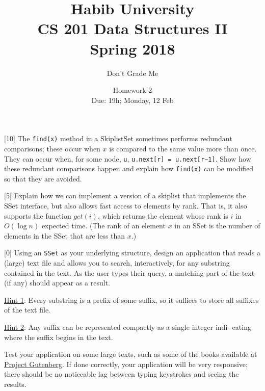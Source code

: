 \documentclass[addpoints]{exam}
\title{Habib University\\CS 201 Data Structures II\\Spring 2018}
\author{Don't Grade Me}  %
\date{Homework 2\\Due: 19h; Monday, 12 Feb}
\begin{document}
\maketitle

\begin{questions}

  [10]
  The {\tt find(x)} method in a SkiplistSet sometimes performs redundant comparisons; these occur when $x$ is compared to the same value more than once. They can occur when, for some node, {\tt u}, {\tt u.next[r] = u.next[r−1]}. Show how these redundant comparisons happen and explain how {\tt find(x)} can be modified so that they are avoided.
\begin{solution}
\end{solution}

[5]
Explain how we can implement a version of a skiplist that implements the SSet interface, but also allows fast access to elements by rank. That is, it also supports the function $get(i)$, which returns the element whose rank is $i$ in $O(\log n)$ expected time. (The rank of an element $x$ in an SSet is the number of elements in the SSet that are less than $x$.)
\begin{solution}
\end{solution}

[0]
Using an {\tt SSet} as your underlying structure, design an application that reads a (large) text file and allows you to search, interactively, for any substring contained in the text. As the user types their query, a matching part of the text (if any) should appear as a result.

\noindent\underline{Hint 1}: Every substring is a prefix of some suffix, so it suffices to store all suffixes of the text file.

\noindent\underline{Hint 2}: Any suffix can be represented compactly as a single integer indi- cating where the suffix begins in the text.

Test your application on some large texts, such as some of the books available at \href{http://www.gutenberg.org/}{Project Gutenberg}. If done correctly, your application will be very responsive; there should be no noticeable lag between typing keystrokes and seeing the results.
\begin{solution}
\end{solution}


\end{questions}
\end{document}
